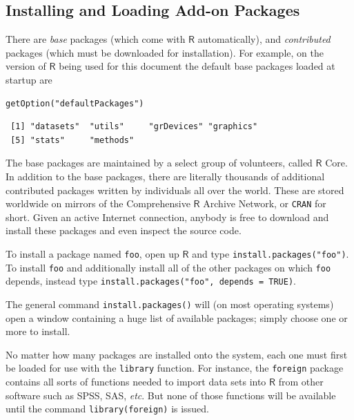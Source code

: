 \documentclass[captions=tableheading]{scrbook}
\begin{document}
\subsection{Installing and Loading Add-on Packages}
\label{sec-2-1-2}
\label{sub-installing-loading-packages}


There are \emph{base} packages (which come with \(\mathsf{R}\) automatically), and \emph{contributed} packages (which must be downloaded for installation). For example, on the version of \(\mathsf{R}\) being used for this document the default base packages loaded at startup are 


\lstset{language=R}
\begin{lstlisting}
getOption("defaultPackages")
\end{lstlisting}

\begin{verbatim}
 [1] "datasets"  "utils"     "grDevices" "graphics" 
 [5] "stats"     "methods"
\end{verbatim}

The base packages are maintained by a select group of volunteers, called \(\mathsf{R}\) Core. In addition to the base packages, there are literally thousands of additional contributed packages written by individuals all over the world. These are stored worldwide on mirrors of the Comprehensive \(\mathsf{R}\) Archive Network, or \texttt{CRAN} for short. Given an active Internet connection, anybody is free to download and install these packages and even inspect the source code.

To install a package named \texttt{foo}, open up \(\mathsf{R}\) and type \texttt{install.packages("foo")}. To install \texttt{foo} and additionally install all of the other packages on which \texttt{foo} depends, instead type \texttt{install.packages("foo", depends = TRUE)}.

The general command \texttt{install.packages()} will (on most operating systems) open a window containing a huge list of available packages; simply choose one or more to install.

No matter how many packages are installed onto the system, each one must first be loaded for use with the \texttt{library} function. For instance, the \texttt{foreign} package \cite{foreign} contains all sorts of functions needed to import data sets into \(\mathsf{R}\) from other software such as SPSS, SAS, \emph{etc}. But none of those functions will be available until the command \texttt{library(foreign)} is issued. 
\end{document}
